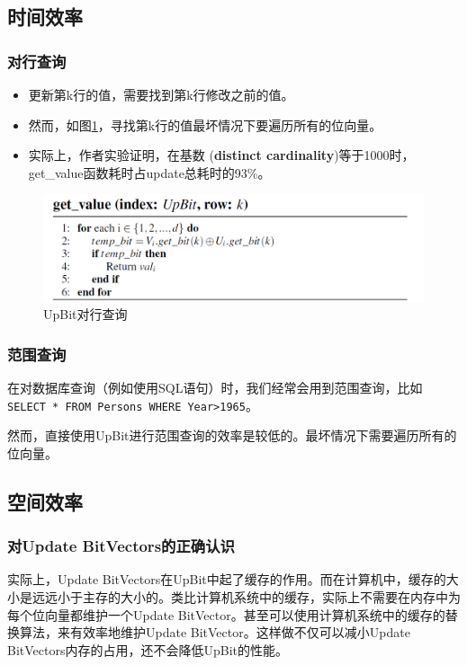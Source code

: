 \documentclass[11pt, a4paper]{article}
\begin{document}
\subsection{时间效率}
\subsubsection{对行查询}
\begin{itemize}
\item 更新第k行的值，需要找到第k行修改之前的值。
\item 然而，如图\ref{fig:get_value}，寻找第k行的值最坏情况下要遍历所有的位向量。
\item 实际上，作者实验证明，在基数 ({\bf distinct cardinality})等于1000时，get\_value函数耗时占update总耗时的93\%。
\end{itemize}
\begin{figure}[H]
  \begin{center}
    \includegraphics[width=4.8in]{img/get_value.png}
    \caption{UpBit对行查询}\label{fig:get_value}
  \end{center}
\end{figure}

\subsubsection{范围查询}
  在对数据库查询（例如使用SQL语句）时，我们经常会用到范围查询，比如\\\texttt{SELECT * FROM Persons WHERE Year>1965}。

  然而，直接使用UpBit进行范围查询的效率是较低的。最坏情况下需要遍历所有的位向量。

\subsection{空间效率}
\subsubsection{对Update BitVectors的正确认识}
实际上，Update BitVectors在UpBit中起了缓存的作用。而在计算机中，缓存的大小是远远小于主存的大小的。类比计算机系统中的缓存，实际上不需要在内存中为每个位向量都维护一个Update BitVector。甚至可以使用计算机系统中的缓存的替换算法，来有效率地维护Update BitVector。这样做不仅可以减小Update BitVectors内存的占用，还不会降低UpBit的性能。
\end{document}
